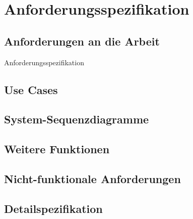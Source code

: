 \chapter{Anforderungsspezifikation}
\label{pd-anforderungsspezifikation}

\section{Anforderungen an die Arbeit}
Anforderungsspezifikation

\section{Use Cases}


\section{System-Sequenzdiagramme}


\section{Weitere Funktionen}


\section{Nicht-funktionale Anforderungen}


\section{Detailspezifikation}

